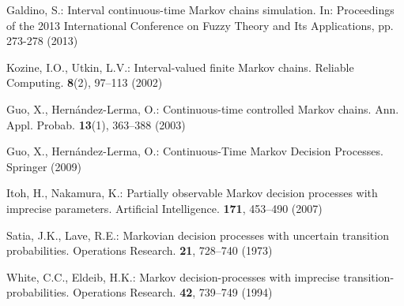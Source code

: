 \begin{thebibliography}{99.}
Galdino, S.: {Interval continuous-time Markov chains simulation}. In: Proceedings of the 2013 International Conference on Fuzzy Theory and Its Applications, pp. 273-278 (2013)

Kozine, I.O., Utkin, L.V.: {Interval-valued finite Markov chains}.
Reliable Computing. \textbf{8}(2), 97--113 (2002)


Guo, X., Hern{\'a}ndez-Lerma, O.: {Continuous-time controlled Markov chains}. Ann. Appl. Probab. \textbf{13}(1), 363--388 (2003)



Guo, X., Hern{\'a}ndez-Lerma, O.: {Continuous-Time Markov Decision Processes}. Springer (2009)

Itoh, H., Nakamura, K.: {Partially observable Markov decision processes
with imprecise parameters}. Artificial Intelligence. \textbf{171}, 453--490 (2007)

Satia, J.K., Lave, R.E.: {Markovian decision processes with uncertain transition probabilities}. Operations Research. \textbf{21}, 728--740 (1973)

White, C.C., Eldeib,  H.K.: {Markov decision-processes with imprecise transition-probabilities}. Operations Research. \textbf{42}, 739--749 (1994)

\end{thebibliography}
